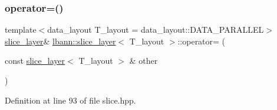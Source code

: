 \subsubsection{\texorpdfstring{operator=()}{operator=()}}
{\footnotesize\ttfamily template$<$data\+\_\+layout T\+\_\+layout = data\+\_\+layout\+::\+D\+A\+T\+A\+\_\+\+P\+A\+R\+A\+L\+L\+EL$>$ \\
\hyperlink{classlbann_1_1slice__layer}{slice\+\_\+layer}\& \hyperlink{classlbann_1_1slice__layer}{lbann\+::slice\+\_\+layer}$<$ T\+\_\+layout $>$\+::operator= (\begin{DoxyParamCaption}\item[{const \hyperlink{classlbann_1_1slice__layer}{slice\+\_\+layer}$<$ T\+\_\+layout $>$ \&}]{other }\end{DoxyParamCaption})\hspace{0.3cm}{\ttfamily [inline]}}



Definition at line 93 of file slice.\+hpp.


